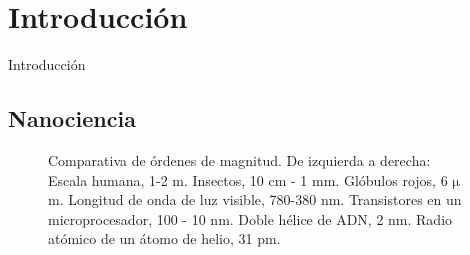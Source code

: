 \documentclass[aspectratio=169]{beamer}
\begin{document}
	\section{Introducción}
	\begin{frame}{Introducción}
		\subsection{Nanociencia}
		\begin{figure}[h!]
			\centering
			\caption[Comparativa de ódenes de magnitud desde metros hasta picometros]{Comparativa de órdenes de magnitud. De izquierda a derecha: Escala humana, 1-2 m. Insectos, 10 cm - 1 mm. Glóbulos rojos, 6 $\mathrm{\mu}$m. Longitud de onda de luz visible, 780-380 nm. Transistores en un microprocesador, 100 - 10 nm. Doble hélice de ADN, 2 nm. Radio atómico de un átomo de helio, 31 pm.}
			\label{fig:scale}
		\end{figure}
	\end{frame}
\end{document}

